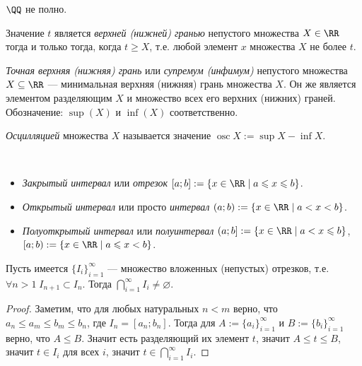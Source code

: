 \documentclass[12pt,a4paper]{article}
\DeclareMathOperator*{\osc}{osc}
\begin{document}
    \begin{corollary*}
        $\QQ$ не полно.
    \end{corollary*}
    
    \begin{definition}
        Значение $t$ является \emph{верхней (нижней) гранью} непустого множества $X \in \RR$ тогда и только тогда, когда $t \geqslant X$, т.е. любой элемент $x$ множества $X$ не более $t$.
        
        
        \emph{Точная верхняя (нижняя) грань} или \emph{супремум (инфимум)} непустого множества $X \subseteq \RR$ --- минимальная верхняя (нижняя) грань множества $X$. Он же является элементом разделяющим $X$ и множество всех его верхних (нижних) граней. Обозначение: $\sup(X)$ и $\inf(X)$ соответственно.

        \emph{Осцилляцией} множества $X$ называется значение $\osc X := \sup X - \inf X$.
    \end{definition}

    \begin{definition}\ 
        \begin{itemize}
            \item \emph{Закрытый интервал} или \emph{отрезок} $[a;b]:=\{x\in\RR \mid a \leqslant x \leqslant b\}$.
            \item \emph{Открытый интервал} или просто \emph{интервал} $(a;b):=\{x\in\RR \mid a < x < b\}$.
            \item \emph{Полуоткрытый интервал} или \emph{полуинтервал} $(a;b] := \{x\in\RR \mid a < x \leqslant b\}$, $[a;b):=\{x\in\RR \mid a \leqslant x < b\}$.
        \end{itemize}
    \end{definition}

    \begin{theorem}\label{th_inter_segments}
        Пусть имеется $\{I_i\}_{i=1}^\infty$ --- множество вложенных (непустых) отрезков, т.е. $\forall n > 1\; I_{n+1} \subset I_n$. Тогда $\bigcap_{i=1}^\infty I_i \neq \varnothing$.
    \end{theorem}

    \begin{proof}
        Заметим, что для любых натуральных $n < m$ верно, что $a_n \leqslant a_m \leqslant b_m \leqslant b_n$, где $I_n = [a_n;b_n]$. Тогда для $A:=\{a_i\}_{i=1}^\infty$ и $B:=\{b_i\}_{i=1}^\infty$ верно, что $A \leqslant B$. Значит есть разделяющий их элемент $t$, значит $A \leqslant t \leqslant B$, значит $t\in I_i$ для всех $i$, значит $t \in \bigcap_{i=1}^\infty I_i$.
    \end{proof}
\end{document}
